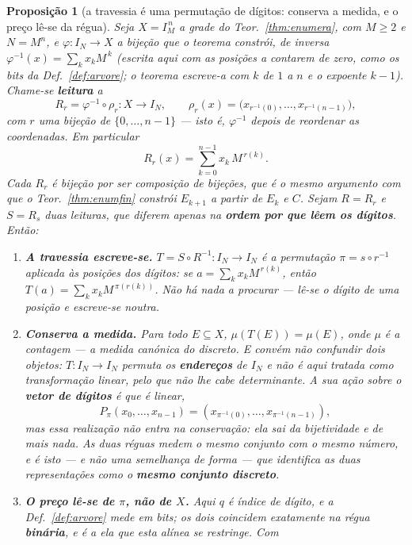\documentclass[11pt,a4paper]{article}
\newtheorem{proposicao}[teorema]{Proposição}
\begin{document}
\begin{proposicao}[a travessia é uma permutação de dígitos: conserva a medida, e o preço lê-se da régua]\label{prop:travessia}
Seja $X=I_M^{\,n}$ a grade do Teor.~\ref{thm:enumera}, com $M\ge2$ e $N=M^{n}$, e
$\varphi\colon I_N\to X$ a bijeção que o teorema constrói, de inversa
$\varphi^{-1}(x)=\sum_k x_k M^{\,k}$ \emph{(escrita aqui com as posições a contarem de
zero, como os bits da Def.~\ref{def:arvore}; o teorema escreve-a com $k$ de $1$ a $n$ e
o expoente $k-1$)}. Chame-se \textbf{leitura} a
\[
 R_r=\varphi^{-1}\circ\rho_r\colon X\to I_N,\qquad
 \rho_r(x)=\bigl(x_{r^{-1}(0)},\dots,x_{r^{-1}(n-1)}\bigr),
\]
com $r$ uma bijeção de $\{0,\dots,n-1\}$ --- isto é, $\varphi^{-1}$ depois de reordenar
as coordenadas. Em particular
\[
 R_r(x)=\sum_{k=0}^{n-1}x_k\,M^{\,r(k)} .
\] \emph{Cada $R_r$ é bijeção por ser composição de bijeções}, que é o
mesmo argumento com que o Teor.~\ref{thm:enumfin} constrói $E_{k+1}$ a partir de $E_k$
e $C$. Sejam $R=R_r$ e $S=R_s$ duas leituras, que diferem apenas na \textbf{ordem por
que lêem os dígitos}. Então:
\begin{enumerate}\itemsep2pt
\item[\textbf{(1)}] \textbf{A travessia escreve-se.} $T=S\circ R^{-1}\colon I_N\to I_N$
  é a permutação
  $\pi=s\circ r^{-1}$ \emph{aplicada às posições dos dígitos}: se
  $a=\sum_k x_k M^{\,r(k)}$, então $T(a)=\sum_k x_k M^{\,\pi(r(k))}$. Não há nada a
  procurar --- lê-se o dígito de uma posição e escreve-se noutra.
\item[\textbf{(2)}] \textbf{Conserva a medida.} Para todo $E\subseteq X$,
  $\mu(T(E))=\mu(E)$, onde $\mu$ é a contagem --- a medida canónica do discreto.
  \emph{E convém não confundir dois objetos}: $T\colon I_N\to I_N$ permuta os
  \textbf{endereços} de $I_N$ e não é aqui tratada como transformação linear, pelo que
  não lhe cabe determinante. A sua ação sobre o \textbf{vetor de dígitos} é que é
  linear,
  \[
   P_{\pi}(x_0,\dots,x_{n-1})=(x_{\pi^{-1}(0)},\dots,x_{\pi^{-1}(n-1)}),
  \]
  \emph{mas essa realização não entra na conservação}: ela sai da bijetividade e de mais
  nada. \emph{As duas réguas medem o mesmo conjunto com o mesmo número}, e é isto --- e
  não uma semelhança de forma --- que identifica as duas representações como o
  \textbf{mesmo conjunto discreto}.
\item[\textbf{(3)}] \textbf{O preço lê-se de $\pi$, não de $X$.} Aqui $q$ é índice
  de \emph{dígito}, e a Def.~\ref{def:arvore} mede em \emph{bits}; os dois coincidem
  exatamente na régua \textbf{binária}, e é a ela que esta alínea se restringe. Com

\end{enumerate}
\end{proposicao}
\end{document}
